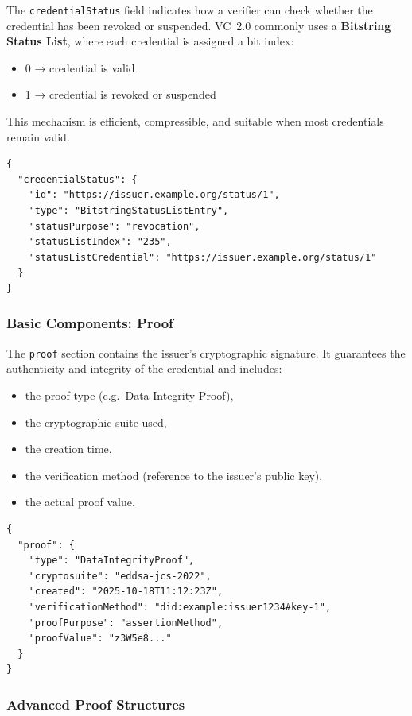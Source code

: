 The \texttt{credentialStatus} field indicates how a verifier can check whether the
credential has been revoked or suspended.  
VC~2.0 commonly uses a \textbf{Bitstring Status List}, where each credential is
assigned a bit index:
\begin{itemize}
    \item 0 → credential is valid  
    \item 1 → credential is revoked or suspended  
\end{itemize}

\noindent
This mechanism is efficient, compressible, and suitable when most credentials
remain valid.

\begin{verbatim}
{
  "credentialStatus": {
    "id": "https://issuer.example.org/status/1",
    "type": "BitstringStatusListEntry",
    "statusPurpose": "revocation",
    "statusListIndex": "235",
    "statusListCredential": "https://issuer.example.org/status/1"
  }
}
\end{verbatim}

\medskip

\subsubsection*{Basic Components: Proof}

The \texttt{proof} section contains the issuer’s cryptographic signature.  
It guarantees the authenticity and integrity of the credential and includes:
\begin{itemize}
    \item the proof type (e.g.\ Data Integrity Proof),
    \item the cryptographic suite used,
    \item the creation time,
    \item the verification method (reference to the issuer’s public key),
    \item the actual proof value.
\end{itemize}

\begin{verbatim}
{
  "proof": {
    "type": "DataIntegrityProof",
    "cryptosuite": "eddsa-jcs-2022",
    "created": "2025-10-18T11:12:23Z",
    "verificationMethod": "did:example:issuer1234#key-1",
    "proofPurpose": "assertionMethod",
    "proofValue": "z3W5e8..."
  }
}
\end{verbatim}

\subsubsection {Advanced Proof Structures}

